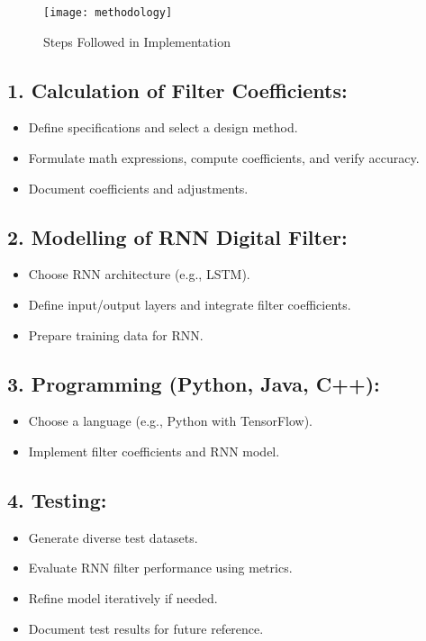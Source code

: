 \begin{figure}[H]
	\texttt{[image: methodology]}
	\caption{Steps Followed in Implementation}
	\label{Fig:fig1}
\end{figure}

\subsection*{1. Calculation of Filter Coefficients:}
\begin{itemize}
	\item Define specifications and select a design method.
	\item Formulate math expressions, compute coefficients, and verify accuracy.
	\item Document coefficients and adjustments.
\end{itemize}

\subsection*{2. Modelling of RNN Digital Filter:}
\begin{itemize}
	\item Choose RNN architecture (e.g., LSTM).
	\item Define input/output layers and integrate filter coefficients.
	\item Prepare training data for RNN.
\end{itemize}

\subsection*{3. Programming (Python, Java, C++):}
\begin{itemize}
	\item Choose a language (e.g., Python with TensorFlow).
	\item Implement filter coefficients and RNN model.
\end{itemize}

\subsection*{4. Testing:}
\begin{itemize}
	\item Generate diverse test datasets.
	\item Evaluate RNN filter performance using metrics.
	\item Refine model iteratively if needed.
	\item Document test results for future reference.
\end{itemize}